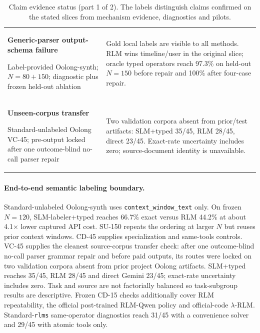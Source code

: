 \documentclass[letterpaper]{article}
\begin{document}
\begin{table}[!htbp]
\begin{tabular}{@{}p{2.15cm}p{4.55cm}@{}}
\textbf{Generic-parser output-schema failure}\par Label-provided Oolong-synth; $N=80+150$; diagnostic plus frozen held-out ablation & Gold local labels are visible to all methods. RLM wins timeline/user in the original slice; oracle typed operators reach 97.3\% on held-out $N=150$ before repair and 100\% after four-case repair. \\
\textbf{Unseen-corpus transfer}\par Standard-unlabeled Oolong VC-45; pre-output locked after one outcome-blind no-call parser repair & Two validation corpora absent from prior/test artifacts: SLM+typed 35/45, RLM 28/45, direct 23/45. Exact-rate uncertainty includes zero; source-document identity is unavailable. \\
\bottomrule
\end{tabular}
\caption{Claim evidence status (part 1 of 2). The labels distinguish claims confirmed on the stated slices from mechanism evidence, diagnostics and pilots.}
\label{tab:supp-claims}
\end{table}

\paragraph{End-to-end semantic labeling boundary.}
Standard-unlabeled Oolong-synth uses \texttt{context\_window\_text} only. On frozen $N=120$, SLM-labeler+typed reaches 66.7\% exact versus RLM 44.2\% at about 4.1$\times$ lower captured API cost. SU-150 repeats the ordering at larger $N$ but reuses prior context windows. CD-45 supplies specialization and same-tools controls. VC-45 supplies the cleanest source-corpus transfer check: after one outcome-blind no-call parser grammar repair and before paid outputs, its routes were locked on two validation corpora absent from prior project Oolong artifacts. SLM+typed reaches 35/45, RLM 28/45 and direct Gemini 23/45; exact-rate uncertainty includes zero. Task and source are not factorially balanced so task-subgroup results are descriptive. Frozen CD-15 checks additionally cover RLM repeatability, the official post-trained RLM-Qwen policy and official-code $\lambda$-RLM. Standard-\texttt{rlms} same-operator diagnostics reach 31/45 with a convenience solver and 29/45 with atomic tools only.
\end{document}
